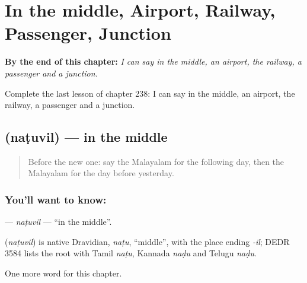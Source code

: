 
\chapter{In the middle, Airport, Railway, Passenger, Junction}
\label{ch:ml-in-the-middle-airport-railway-passenger-junction}

\begin{chapteropening}
\textbf{By the end of this chapter:} \emph{I can say in the middle, an airport, the railway, a passenger and a junction.}

Complete the last lesson of chapter 238: I can say in the middle, an airport, the railway, a passenger and a junction.
\end{chapteropening}

\section[\texorpdfstring{\ml{നടുവിൽ} (naṭuvil)}{നടുവിൽ (naṭuvil)}]{ (naṭuvil) — in the middle}

\label{lesson:ML-C238-natuvil}



\begin{quote}
Before the new one: say the Malayalam for the following day, then the Malayalam for the day before yesterday.
\end{quote}

\subsection*{You'll want to know: }
\textbf{} — \emph{naṭuvil} — \textquotedblleft{}in the middle\textquotedblright{}.

\begin{cousinweb}
\textbf{} (\emph{naṭuvil}) is native Dravidian, \emph{naṭu}, \textquotedblleft{}middle\textquotedblright{}, with the place ending \emph{-il}; DEDR 3584 lists the root with Tamil \emph{naṭu}, Kannada \emph{naḍu} and Telugu \emph{naḍu}.
\end{cousinweb}

\begin{grammarlens}[title={What you've built}]
One more word for this chapter.
\end{grammarlens}

